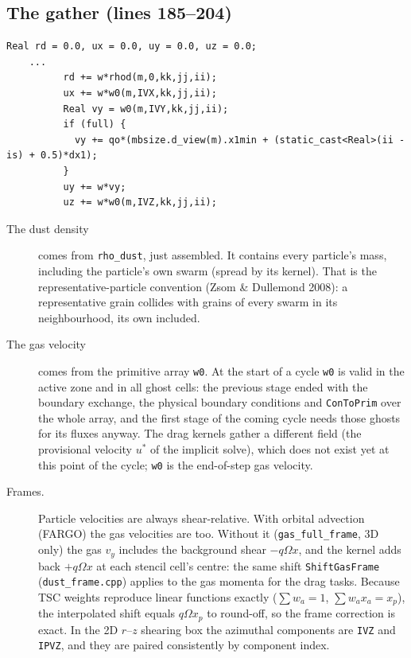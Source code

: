 \documentclass[11pt]{article}
\newcommand{\code}[1]{\texttt{#1}}
\newcommand{\file}[1]{\texttt{\small #1}}
\newcommand{\fn}[1]{\texttt{\small #1}}
\begin{document}
\subsection{The gather (lines 185--204)}
\begin{lstlisting}[firstnumber=185]
    Real rd = 0.0, ux = 0.0, uy = 0.0, uz = 0.0;
    ...
          rd += w*rhod(m,0,kk,jj,ii);
          ux += w*w0(m,IVX,kk,jj,ii);
          Real vy = w0(m,IVY,kk,jj,ii);
          if (full) {
            vy += qo*(mbsize.d_view(m).x1min + (static_cast<Real>(ii - is) + 0.5)*dx1);
          }
          uy += w*vy;
          uz += w*w0(m,IVZ,kk,jj,ii);
\end{lstlisting}
\begin{description}
\item[The dust density] comes from \code{rho\_dust}, just assembled. It contains every
  particle's mass, including the particle's own swarm (spread by its kernel). That is
  the representative-particle convention (Zsom \& Dullemond 2008): a representative
  grain collides with grains of every swarm in its neighbourhood, its own included.
\item[The gas velocity] comes from the primitive array \code{w0}. At the start of a
  cycle \code{w0} is valid in the active zone and in all ghost cells: the previous
  stage ended with the boundary exchange, the physical boundary conditions and
  \fn{ConToPrim} over the whole array, and the first stage of the coming cycle needs
  those ghosts for its fluxes anyway. The drag kernels gather a different field (the
  provisional velocity $u^\ast$ of the implicit solve), which does not exist yet at
  this point of the cycle; \code{w0} is the end-of-step gas velocity.
\item[Frames.] Particle velocities are always shear-relative. With orbital advection
  (FARGO) the gas velocities are too. Without it (\code{gas\_full\_frame}, 3D only) the
  gas $v_y$ includes the background shear $-q\Omega x$, and the kernel adds back
  $+q\Omega x$ at each stencil cell's centre: the same shift \fn{ShiftGasFrame}
  (\file{dust\_frame.cpp}) applies to the gas momenta for the drag tasks. Because TSC
  weights reproduce linear functions exactly ($\sum w_a=1$, $\sum w_a x_a=x_p$), the
  interpolated shift equals $q\Omega x_p$ to round-off, so the frame correction is
  exact. In the 2D $r$--$z$ shearing box the azimuthal components are \code{IVZ} and
  \code{IPVZ}, and they are paired consistently by component index.
\end{description}
\end{document}
